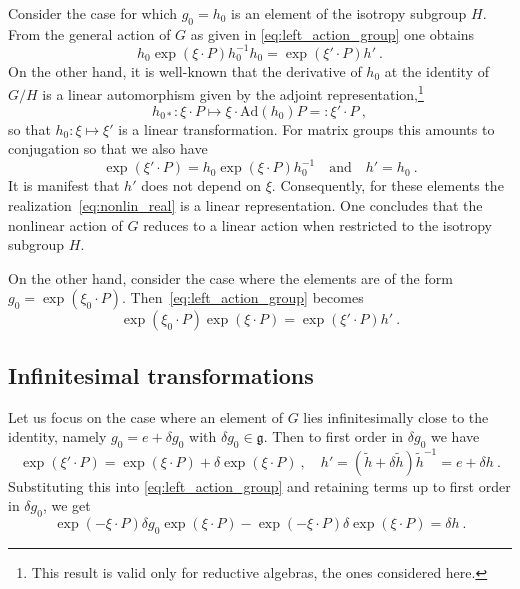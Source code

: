 \documentclass[11pt]{article}
\begin{document}
Consider the case for which $g_0 = h_0$ is an element of the 
isotropy subgroup $H$. From the general action of $G$ as given in 
\eqref{eq:left_action_group} one obtains
%
\begin{displaymath}
	h_0 \exp(\xi\cdot P) h_0^{-1}h_0 = \exp(\xi'\cdot P) h'~.
\end{displaymath}
On the other hand, it is well-known that the derivative of $h_0$ 
at the identity of $G/H$ is a linear automorphism given by the 
adjoint representation,\footnote{This result is valid only for 
	reductive algebras, the ones considered here.}
\begin{displaymath}
	h_{0\ast}: \xi\cdot P \mapsto \xi\cdot \mathrm{Ad}(h_0)P =: 
	\xi'\cdot P~,
\end{displaymath}
so that $h_0 : \xi \mapsto \xi'$ is a linear transformation. For 
matrix groups this amounts to conjugation so that we also have
\begin{displaymath}
	\exp(\xi'\cdot P) = h_0\exp(\xi\cdot P)h_0^{-1}\quad
	\text{and}\quad
	h' = h_0~.
\end{displaymath}
It is manifest that $h'$ does not depend on $\xi$. Consequently, 
for these elements the realization~\eqref{eq:nonlin_real} is a 
linear representation.  One concludes that the nonlinear action 
of $G$ reduces to a linear action when restricted to the isotropy 
subgroup $H$.

On the other hand, consider the case where the elements are of 
the form $g_0 = \exp(\xi_0\cdot P)$. 
Then~\eqref{eq:left_action_group} becomes
%
\begin{equation}\label{eq:left_action_coset}
	\exp(\xi_0\cdot P)\exp(\xi\cdot P) = \exp(\xi'\cdot P)h'~.
\end{equation}


\subsection{Infinitesimal transformations}

Let us focus on the case where an element of $G$ lies 
infinitesimally close to the identity, namely $g_0 = e + \delta 
g_0$ with $\delta g_0 \in \mathfrak{g}$.  Then to first order in 
$\delta g_0$ we have
%
\begin{displaymath}
	\exp(\xi'\cdot P) = \exp(\xi\cdot P) + \delta\exp(\xi\cdot P)~,
	\quad	h' = (\tilde{h} + \delta \tilde{h})\tilde{h}^{-1} = e + 
	\delta h~.
\end{displaymath}
Substituting this into \eqref{eq:left_action_group} and retaining 
terms up to first order in $\delta g_0$, we get
%
\begin{displaymath}
	\exp(-\xi\cdot P) \delta g_0 \exp(\xi\cdot P) - \exp(-\xi\cdot 
	P) \delta\exp(\xi\cdot P) = \delta h~.
\end{displaymath}
\end{document}
